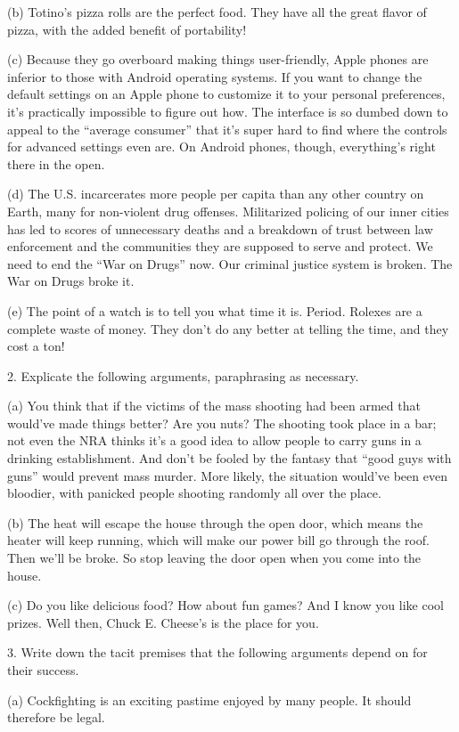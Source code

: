 (b) Totino's pizza rolls are the perfect food. They have all the great flavor of pizza, with
the added benefit of portability!

(c) Because they go overboard making things user-friendly, Apple phones are inferior to
those with Android operating systems. If you want to change the default settings on an
Apple phone to customize it to your personal preferences, it's practically impossible to
figure out how. The interface is so dumbed down to appeal to the ``average consumer'' that
it's super hard to find where the controls for advanced settings even are. On Android
phones, though, everything's right there in the open.

(d) The U.S. incarcerates more people per capita than any other country on Earth, many
for non-violent drug offenses. Militarized policing of our inner cities has led to scores of
unnecessary deaths and a breakdown of trust between law enforcement and the
communities they are supposed to serve and protect. We need to end the ``War on Drugs''
now. Our criminal justice system is broken. The War on Drugs broke it.

(e) The point of a watch is to tell you what time it is. Period. Rolexes are a complete waste
of money. They don't do any better at telling the time, and they cost a ton!

2. Explicate the following arguments, paraphrasing as necessary.

(a) You think that if the victims of the mass shooting had been armed that would've made
things better? Are you nuts? The shooting took place in a bar; not even the NRA thinks it's
a good idea to allow people to carry guns in a drinking establishment. And don't be fooled
by the fantasy that ``good guys with guns'' would prevent mass murder. More likely, the
situation would've been even bloodier, with panicked people shooting randomly all over
the place.

(b) The heat will escape the house through the open door, which means the heater will
keep running, which will make our power bill go through the roof. Then we'll be broke.
So stop leaving the door open when you come into the house.

(c) Do you like delicious food? How about fun games? And I know you like cool prizes.
Well then, Chuck E. Cheese's is the place for you.

3. Write down the tacit premises that the following arguments depend on for their success.

(a) Cockfighting is an exciting pastime enjoyed by many people. It should therefore be
legal.


